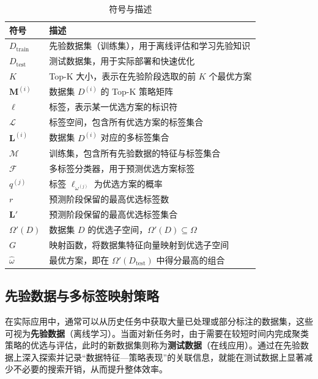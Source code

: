 \documentclass[10pt]{article} %
\numberwithin{equation}{section}
\begin{document}
\begin{table}[t]
\centering
\small %
\renewcommand{\arraystretch}{1.1} %
\label{tab:symbols-advanced}
\begin{tabular}{ll}
\toprule
\textbf{符号} & \textbf{描述} \\
\midrule
$D_{\text{train}}$ & 先验数据集（训练集），用于离线评估和学习先验知识 \\
$D_{\text{test}}$ & 测试数据集，用于实际部署和快速优化 \\
$K$ & Top-K 大小，表示在先验阶段选取的前 $K$ 个最优方案 \\
$\mathbf{M}^{(i)}$ & 数据集 $D^{(i)}$ 的 Top-K 策略矩阵 \\
$\ell$ & 标签，表示某一优选方案的标识符 \\
$\mathcal{L}$ & 标签空间，包含所有优选方案的标签集合 \\
$\mathbf{L}^{(i)}$ & 数据集 $D^{(i)}$ 对应的多标签集合 \\
$\mathcal{M}$ & 训练集，包含所有先验数据的特征与标签集合 \\
$\mathcal{F}$ & 多标签分类器，用于预测优选方案标签 \\
$q^{(j)}$ & 标签 $\ell_{\omega^{(j)}}$ 为优选方案的概率 \\
$r$ & 预测阶段保留的最高优选标签数 \\
$\mathbf{L}'$ & 预测阶段保留的最高优选标签集合 \\
$\Omega'(D)$ & 数据集 $D$ 的优选子空间，$\Omega'(D) \subseteq \Omega$ \\
$G$ & 映射函数，将数据集特征向量映射到优选子空间 \\
$\hat{\omega}$ & 最优方案，即在 $\Omega'(D_{\text{test}})$ 中得分最高的组合 \\
\bottomrule
\end{tabular}
\caption{符号与描述}
\end{table}

\subsection{先验数据与多标签映射策略}
\label{sec:prior-data-mapping}

在实际应用中，通常可以从历史任务中获取大量已处理或部分标注的数据集，这些可视为\textbf{先验数据}（离线学习）。当面对新任务时，由于需要在较短时间内完成聚类策略的优选与评估，此时的新数据集则称为\textbf{测试数据}（在线应用）。通过在先验数据上深入探索并记录“数据特征—策略表现”的关联信息，就能在测试数据上显著减少不必要的搜索开销，从而提升整体效率。
\end{document}

